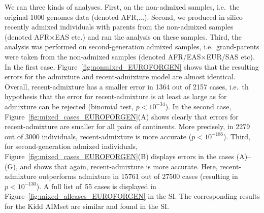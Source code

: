 \documentclass[12pt]{article}
\theoremstyle{definition}
\begin{document}
We ran three kinds of analyses. First, on the non-admixed samples,
i.e.\ the original 1000 genomes data (denoted AFR,...). Second, we
produced in silico recently admixed individuals with parents from the
non-admixed samples (denoted AFR$\times$EAS etc.) and ran the analysis
on these samples. Third, the analysis was performed on
second-generation admixed samples, i.e.\ grand-parents were taken from
the non-admixed samples (denoted AFR/EAS$\times$EUR/SAS etc). In the
first case, Figure~\ref{fig:nonmixed_EUROFORGEN} shows that the
resulting errors for the admixture and recent-admixture model are
almost identical. Overall, recent-admixture has a smaller error in
1364 out of 2157 cases, i.e.\ th hypothesis that the error for
recent-admixture is at least as large as for admixture can be rejected
(binomial test, $p<10^{-34}$). In the second case,
Figure~\ref{fig:mixed_cases_EUROFORGEN}(A) shows clearly that errors
for recent-admixture are smaller for all pairs of continents. More
precisely, in 2279 out of 3000 individuals, recent-admixture is more
accurate ($p<10^{-186}$). Third, for second-generation admixed
individuals, Figure~\ref{fig:mixed_cases_EUROFORGEN}(B) displays
errors in the cases (A)--(G), and shows that again, recent-admixture
is more accurate. Here, recent-admixture outperforms admixture in
15761 out of 27500 cases (resulting in $p<10^{-130}$). A full list
of~55 cases is displayed in Figure~\ref{fig:mixed_allcases_EUROFORGEN}
in the SI. The corresponding results for the Kidd AIMset are similar
and found in the SI.
\end{document}
